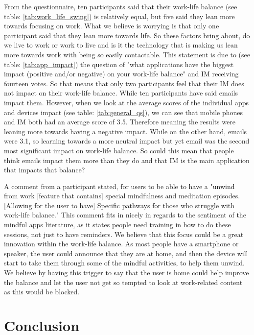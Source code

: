\documentclass{sigchi}
\begin{document}
		
	From the questionnaire, ten participants said that their work-life balance (see table: \ref{tab:work_life_swing}) is relatively equal, but five said they lean more towards focusing on work. What we believe is worrying is that only one participant said that they lean more towards life. So these factors bring about, do we live to work or work to live and is it the technology that is making us lean more towards work with being so easily contactable. This statement is due to (see table: \ref{tab:app_impact}) the question of "what applications have the biggest impact (positive and/or negative) on your work-life balance" and IM receiving fourteen votes. So that means that only two participants feel that their IM does not impact on their work-life balance. While ten participants have said emails impact them. However, when we look at the average scores of the individual apps and devices impact (see table: \ref{tab:general_qs}), we can see that mobile phones and IM both had an average score of 3.5. Therefore meaning the results were leaning more towards having a negative impact. While on the other hand, emails were 3.1, so learning towards a more neutral impact but yet email was the second most significant impact on work-life balance. So could this mean that people think emails impact them more than they do and that IM is the main application that impacts that balance?
	
	A comment from a participant stated, for users to be able to have a "unwind from work [feature that contains] special mindfulness and meditation episodes. [Allowing for the user to have] Specific pathways for those who struggle with work-life balance." This comment fits in nicely in regards to the sentiment of the mindful apps literature, as it states people need training in how to do these sessions, not just to have reminders. We believe that this focus could be a great innovation within the work-life balance. As most people have a smartphone or speaker, the user could announce that they are at home, and then the device will start to take them through some of the mindful activities, to help them unwind. We believe by having this trigger to say that the user is home could help improve the balance and let the user not get so tempted to look at work-related content as this would be blocked. 


\section{Conclusion}
	 
\end{document}
